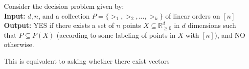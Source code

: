 \documentclass[12pt]{article}
\newcommand{\Rgz}{\mathbb{R}_{\ge 0}}
\newcommand{\1}[1]{\mathds{1}[{#1}]}
\begin{document}
  Consider the decision problem given by: \\
  \textbf{Input:} $d, n$, and a collection $P = \{ >_1, >_2, \ldots, >_k\}$
  of linear orders on $[n]$ \\
  \textbf{Output:} YES if there exists a set of $n$ points $X\subseteq \Rgz^d$
  in $d$ dimensions such that $P \subseteq P(X)$
  (according to some labeling of points in $X$ with $[n]$),
  and NO otherwise.

  This is equivalent to asking whether there exist
  vectors 
\end{document}
